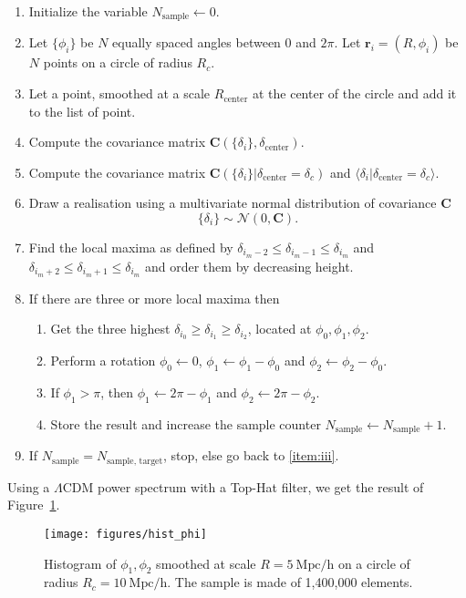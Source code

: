 \documentclass[useAMS,usenatbib,babel,superscriptaddress]{mnras}
\newcommand{\SI}[2]{\ensuremath{#1~\mathrm{#2}}}
\newcommand{\rr}{\mathbf{r}}
\newcommand{\condmean}[2]{
  \langle #1
  |#2
  \rangle}
\begin{document}
\begin{enumerate}
\item Initialize the variable $N_\text{sample} \leftarrow 0$.

\item Let $\{\phi_i\}$ be $N$ equally spaced angles between $0$ and $2\pi$. Let $\rr_i = (R, \phi_i)$ be $N$ points on a circle of radius $R_c$.
\item Let a point, smoothed at a scale $R_\text{center}$ at the center of the circle and add it to the list of point.
\item Compute the covariance matrix $\mathbf{C}(\{\delta_i\}, \delta_\text{center})$.
\item Compute the covariance matrix $\mathbf{C}(\{\delta_i\}|\delta_\text{center} = \delta_c)$ and $\condmean{\delta_i}{\delta_\text{center} = \delta_c}$.
\item\label{item:iii} Draw a realisation using a multivariate normal distribution of covariance $\mathbf{C}$
  \begin{equation}
    \{\delta_i\} \sim \mathcal{N}(0, \mathbf{C}).
  \end{equation}
\item Find the local maxima as defined by $\delta_{i_m-2} \leq \delta_{i_m-1} \leq \delta_{i_m}$ and $\delta_{i_m+2} \leq \delta_{i_m+1} \leq \delta_{i_m}$ and order them by decreasing height.
\item If there are three or more local maxima then
  \begin{enumerate}
  \item Get the three highest $\delta_{i_0} \geq \delta_{i_1} \geq \delta_{i_2}$, located at $\phi_0, \phi_1, \phi_2$.
  \item Perform a rotation $\phi_0\leftarrow 0$, $\phi_1\leftarrow\phi_1 - \phi_0$ and $\phi_2\leftarrow\phi_2 - \phi_0$.
  \item If $\phi_1 > \pi$, then $\phi_1\leftarrow 2\pi-\phi_1$ and $\phi_2\leftarrow 2\pi-\phi_2$.
  \item Store the result and increase the sample counter $N_\text{sample}\leftarrow N_\text{sample}+1$.
  \end{enumerate}
\item If $N_\text{sample} = N_\text{sample, target}$, stop, else go back to \ref{item:iii}.
\end{enumerate}

Using a $\Lambda$CDM power spectrum with a Top-Hat filter, we get the result of Figure~\ref{fig:distrib_phi}.
\begin{figure}
  \centering
  \texttt{[image: figures/hist\_phi]}
  \caption{Histogram of $\phi_1,\phi_2$ smoothed at scale $R=\SI{5}{Mpc/h}$ on a circle of radius $R_c=\SI{10}{Mpc/h}$. The sample is made of 1,400,000 elements.}
  \label{fig:distrib_phi}
\end{figure}
\end{document}
